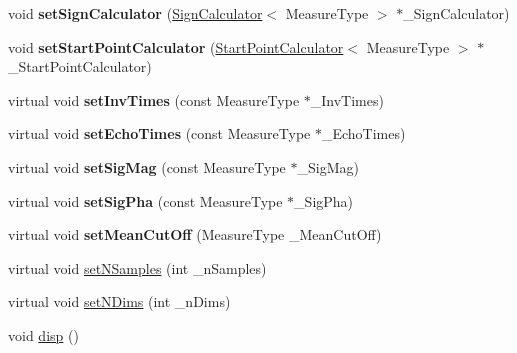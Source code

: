 \begin{DoxyCompactItemize}
\item 
\hypertarget{class_ox_1_1_calculator_a9b29545ec9a0e911217f496f7d539471}{void {\bfseries set\-Sign\-Calculator} (\hyperlink{class_ox_1_1_sign_calculator}{Sign\-Calculator}$<$ Measure\-Type $>$ $\ast$\-\_\-\-Sign\-Calculator)}\label{class_ox_1_1_calculator_a9b29545ec9a0e911217f496f7d539471}

\item 
\hypertarget{class_ox_1_1_calculator_a1ea380bc76e9cd19f0a04254ae167230}{void {\bfseries set\-Start\-Point\-Calculator} (\hyperlink{class_ox_1_1_start_point_calculator}{Start\-Point\-Calculator}$<$ Measure\-Type $>$ $\ast$\-\_\-\-Start\-Point\-Calculator)}\label{class_ox_1_1_calculator_a1ea380bc76e9cd19f0a04254ae167230}

\item 
\hypertarget{class_ox_1_1_calculator_a1dcb241d551a06436108a9f4bf916ece}{virtual void {\bfseries set\-Inv\-Times} (const Measure\-Type $\ast$\-\_\-\-Inv\-Times)}\label{class_ox_1_1_calculator_a1dcb241d551a06436108a9f4bf916ece}

\item 
\hypertarget{class_ox_1_1_calculator_aaf50e9d3fae8e95ff981bf15e17bba28}{virtual void {\bfseries set\-Echo\-Times} (const Measure\-Type $\ast$\-\_\-\-Echo\-Times)}\label{class_ox_1_1_calculator_aaf50e9d3fae8e95ff981bf15e17bba28}

\item 
\hypertarget{class_ox_1_1_calculator_a51fb95a1a68b1e14b659761c1f64aaab}{virtual void {\bfseries set\-Sig\-Mag} (const Measure\-Type $\ast$\-\_\-\-Sig\-Mag)}\label{class_ox_1_1_calculator_a51fb95a1a68b1e14b659761c1f64aaab}

\item 
\hypertarget{class_ox_1_1_calculator_a7b753dac0897ee4a5cb9c4d7a21d0926}{virtual void {\bfseries set\-Sig\-Pha} (const Measure\-Type $\ast$\-\_\-\-Sig\-Pha)}\label{class_ox_1_1_calculator_a7b753dac0897ee4a5cb9c4d7a21d0926}

\item 
\hypertarget{class_ox_1_1_calculator_ad945e3f4dd3405c940bc8a22ea3f3ee9}{virtual void {\bfseries set\-Mean\-Cut\-Off} (Measure\-Type \-\_\-\-Mean\-Cut\-Off)}\label{class_ox_1_1_calculator_ad945e3f4dd3405c940bc8a22ea3f3ee9}

\item 
virtual void \hyperlink{class_ox_1_1_calculator_a1d0d07b7840883449168448983d43289}{set\-N\-Samples} (int \-\_\-n\-Samples)
\item 
virtual void \hyperlink{class_ox_1_1_calculator_a40c854c0d75685ecc1da531f7400e3b1}{set\-N\-Dims} (int \-\_\-n\-Dims)
\item 
\hypertarget{class_ox_1_1_calculator_a938a4bb0d2bc586bfb6982df28befbbf}{void \hyperlink{class_ox_1_1_calculator_a938a4bb0d2bc586bfb6982df28befbbf}{disp} ()}\label{class_ox_1_1_calculator_a938a4bb0d2bc586bfb6982df28befbbf}


\end{DoxyCompactItemize}
